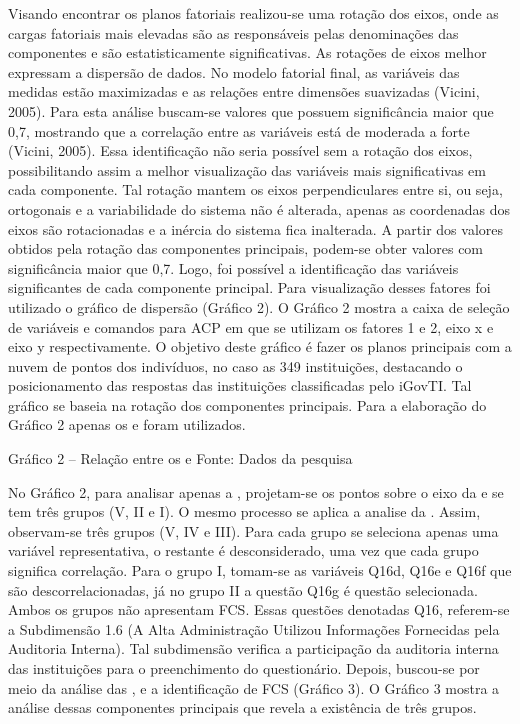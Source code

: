Visando encontrar os planos fatoriais realizou-se uma rotação dos eixos, onde as cargas fatoriais mais elevadas são as responsáveis pelas denominações das componentes e são estatisticamente significativas. As rotações de eixos melhor expressam a dispersão de dados. No modelo fatorial final, as variáveis das medidas estão maximizadas e as relações entre dimensões suavizadas (Vicini, 2005).
Para esta análise buscam-se valores que possuem significância maior que 0,7, mostrando que a correlação entre as variáveis está de moderada a forte (Vicini, 2005). Essa identificação não seria possível sem a rotação dos eixos, possibilitando assim a melhor visualização das variáveis mais significativas em cada componente. Tal rotação mantem os eixos perpendiculares entre si, ou seja, ortogonais e a variabilidade do sistema não é alterada, apenas as coordenadas dos eixos são rotacionadas e a inércia do sistema fica inalterada. 
A partir dos valores obtidos pela rotação das componentes principais, podem-se obter valores com significância maior que 0,7. Logo, foi possível a identificação das variáveis significantes de cada componente principal.
Para visualização desses fatores foi utilizado o gráfico de dispersão (Gráfico 2). O Gráfico 2 mostra a caixa de seleção de variáveis e comandos para ACP em que se utilizam os fatores 1 e 2, eixo x e eixo y respectivamente. O objetivo deste gráfico é fazer os planos principais com a nuvem de pontos dos indivíduos, no caso as 349 instituições, destacando o posicionamento das respostas das instituições classificadas pelo iGovTI. Tal gráfico se baseia na rotação dos componentes principais. Para a elaboração do Gráfico 2 apenas os  e  foram utilizados.
 
Gráfico 2 – Relação entre os  e  
Fonte: Dados da pesquisa

No Gráfico 2, para analisar apenas a , projetam-se os pontos sobre o eixo da e se tem três grupos (V, II e I). O mesmo processo se aplica a analise da . Assim, observam-se três grupos (V, IV e III). Para cada grupo se seleciona apenas uma variável representativa, o restante é desconsiderado, uma vez que cada grupo significa correlação.
Para o grupo I, tomam-se as variáveis Q16d, Q16e e Q16f que são descorrelacionadas, já no grupo II a questão Q16g é questão selecionada. Ambos os grupos não apresentam FCS. Essas questões denotadas Q16, referem-se a Subdimensão 1.6 (A Alta Administração Utilizou Informações Fornecidas pela Auditoria Interna). Tal subdimensão verifica a participação da auditoria interna das instituições para o preenchimento do questionário. 
Depois, buscou-se por meio da análise das ,  e a identificação de FCS (Gráfico 3). O Gráfico 3 mostra a análise dessas componentes principais que revela a existência de três grupos. 

